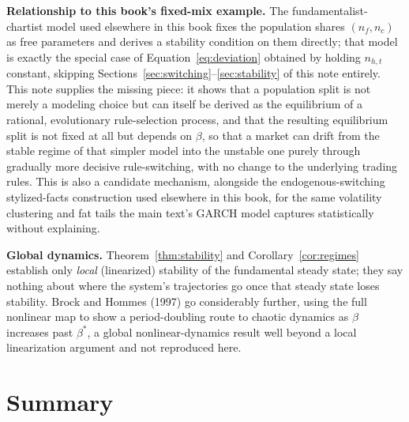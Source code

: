 \documentclass[11pt]{article}
\theoremstyle{remark}
\theoremstyle{definition}
\begin{document}
\textbf{Relationship to this book's fixed-mix example.} The fundamentalist-chartist model used elsewhere in this book fixes the population shares $(n_f,n_c)$ as free parameters and derives a stability condition on them directly; that model is exactly the special case of Equation~\eqref{eq:deviation} obtained by holding $n_{h,t}$ constant, skipping Sections~\ref{sec:switching}--\ref{sec:stability} of this note entirely. This note supplies the missing piece: it shows that a population split is not merely a modeling choice but can itself be derived as the equilibrium of a rational, evolutionary rule-selection process, and that the resulting equilibrium split is not fixed at all but depends on $\beta$, so that a market can drift from the stable regime of that simpler model into the unstable one purely through gradually more decisive rule-switching, with no change to the underlying trading rules. This is also a candidate mechanism, alongside the endogenous-switching stylized-facts construction used elsewhere in this book, for the same volatility clustering and fat tails the main text's GARCH model captures statistically without explaining.

\textbf{Global dynamics.} Theorem~\ref{thm:stability} and Corollary~\ref{cor:regimes} establish only \emph{local} (linearized) stability of the fundamental steady state; they say nothing about where the system's trajectories go once that steady state loses stability. Brock and Hommes (1997) go considerably further, using the full nonlinear map to show a period-doubling route to chaotic dynamics as $\beta$ increases past $\beta^{*}$, a global nonlinear-dynamics result well beyond a local linearization argument and not reproduced here.

\section{Summary}
\label{sec:summary}
\end{document}
